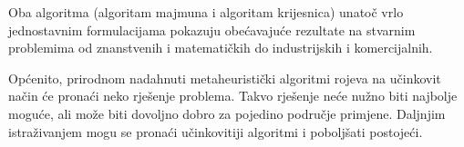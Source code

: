 Oba algoritma (algoritam majmuna i algoritam krijesnica) unatoč vrlo jednostavnim formulacijama pokazuju obećavajuće rezultate na stvarnim problemima od znanstvenih i matematičkih do industrijskih i komercijalnih. 

Općenito, prirodnom nadahnuti metaheuristički algoritmi rojeva na učinkovit način će pronaći neko rješenje problema. Takvo rješenje neće nužno biti najbolje moguće, ali može biti dovoljno dobro za pojedino područje primjene. Daljnjim istraživanjem mogu se pronaći učinkovitiji algoritmi i poboljšati postojeći.